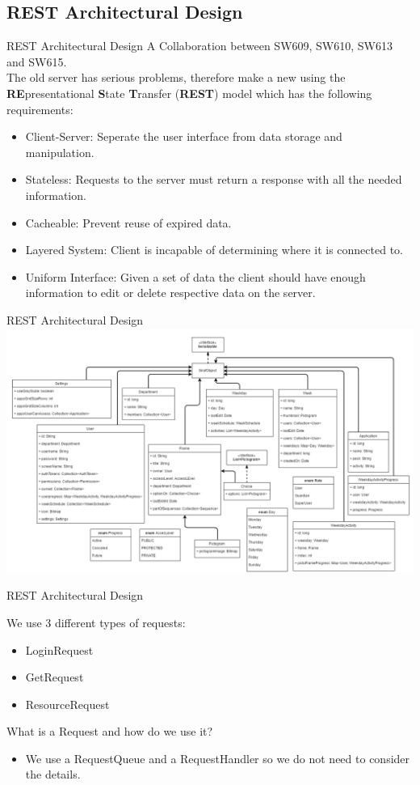 \subsection{REST Architectural Design}
\begin{frame}{REST Architectural Design}
A Collaboration between SW609, SW610, SW613 and SW615.\\

The old server has serious problems, therefore make a new using the \textbf{RE}presentational \textbf{S}tate \textbf{T}ransfer (\textbf{REST}) model which has the following requirements:
\begin{itemize}
\item Client-Server: Seperate the user interface from data storage and manipulation.
\item Stateless: Requests to the server must return a response with all the needed information.
\item Cacheable: Prevent reuse of expired data.
\item Layered System: Client is incapable of determining where it is connected to.
\item Uniform Interface: Given a set of data the client should have enough information to edit or delete respective data on the server.
\end{itemize}
\end{frame}

\begin{frame}{REST Architectural Design}
\includegraphics[scale=0.3]{figures/Giraf_RestModelV3.PNG}
\end{frame}

\begin{frame}{REST Architectural Design}

We use 3 different types of requests:
\begin{itemize}
\item LoginRequest
\item GetRequest
\item ResourceRequest
\end{itemize}

What is a Request and how do we use it?
\begin{itemize}
\item We use a RequestQueue and a RequestHandler so we do not need to consider the details.
\end{itemize}

\end{frame}

